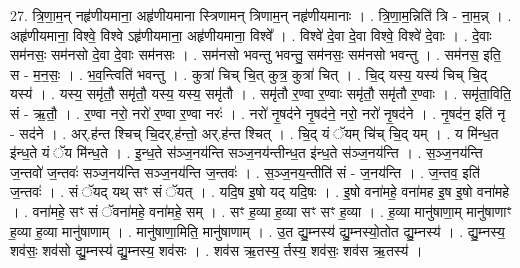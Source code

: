 \documentclass[17pt]{extarticle}
\begin{document}
27. त्रि॒णा॒म॒न् नहृ॑णीयमाना॒ अहृ॑णीयमाना स्त्रिणामन् त्रिणाम॒न् नहृ॑णीयमानाः । . त्रि॒णा॒म॒न्निति॑ त्रि - ना॒म॒न्न् । . अहृ॑णीयमाना॒ विश्वे॒ विश्वे ऽहृ॑णीयमाना॒ अहृ॑णीयमाना॒ विश्वे᳚ । . विश्वे॑ दे॒वा दे॒वा विश्वे॒ विश्वे॑ दे॒वाः । . दे॒वाः सम॑नसः॒ सम॑नसो दे॒वा दे॒वाः सम॑नसः । . सम॑नसो भवन्तु भवन्तु॒ सम॑नसः॒ सम॑नसो भवन्तु । . सम॑नस॒ इति॒ स - म॒न॒सः॒ । . भ॒व॒न्त्विति॑ भवन्तु । . कुत्रा॑ चिच् चि॒त् कुत्र॒ कुत्रा॑ चित् । . चि॒द् यस्य॒ यस्य॑ चिच् चि॒द् यस्य॑ । . यस्य॒ समृ॑तौ॒ समृ॑तौ॒ यस्य॒ यस्य॒ समृ॑तौ । . समृ॑तौ र॒ण्वा र॒ण्वाः समृ॑तौ॒ समृ॑तौ र॒ण्वाः । . समृ॑ता॒विति॒ सं - ऋ॒तौ॒ । . र॒ण्वा नरो॒ नरो॑ र॒ण्वा र॒ण्वा नरः॑ । . नरो॑ नृ॒षद॑ने नृ॒षद॑ने॒ नरो॒ नरो॑ नृ॒षद॑ने । . नृ॒षद॑न॒ इति॑ नृ - सद॑ने । . अर्.ह॑न्त श्चिच् चि॒दर्.ह॑न्तो॒ अर्.ह॑न्त श्चित् । . चि॒द् यं ॅयम् चि॑च् चि॒द् यम् । . य मि॑न्ध॒त इ॑न्ध॒ते यं ॅय मि॑न्ध॒ते । . इ॒न्ध॒ते स॑ञ्ज॒नय॑न्ति सञ्ज॒नय॑न्तीन्ध॒त इ॑न्ध॒ते स॑ञ्ज॒नय॑न्ति । . स॒ञ्ज॒नय॑न्ति ज॒न्तवो॑ ज॒न्तवः॑ सञ्ज॒नय॑न्ति सञ्ज॒नय॑न्ति ज॒न्तवः॑ । . स॒ञ्ज॒नय॒न्तीति॑ सं - ज॒नय॑न्ति । . ज॒न्तव॒ इति॑ ज॒न्तवः॑ । . सं ॅयद् यथ् सꣳ सं ॅयत् । . यदि॒ष इ॒षो यद् यदि॒षः । . इ॒षो वना॑महे॒ वना॑मह इ॒ष इ॒षो वना॑महे । . वना॑महे॒ सꣳ सं ॅवना॑महे॒ वना॑महे॒ सम् । . सꣳ ह॒व्या ह॒व्या सꣳ सꣳ ह॒व्या । . ह॒व्या मानु॑षाणा॒म् मानु॑षाणाꣳ ह॒व्या ह॒व्या मानु॑षाणाम् । . मानु॑षाणा॒मिति॒ मानु॑षाणाम् । . उ॒त द्यु॒म्नस्य॑ द्यु॒म्नस्यो॒तोत द्यु॒म्नस्य॑ । . द्यु॒म्नस्य॒ शव॑सः॒ शव॑सो द्यु॒म्नस्य॑ द्यु॒म्नस्य॒ शव॑सः । . शव॑स ऋ॒तस्य॒ र्तस्य॒ शव॑सः॒ शव॑स ऋ॒तस्य॑ । \newline
\end{document}

